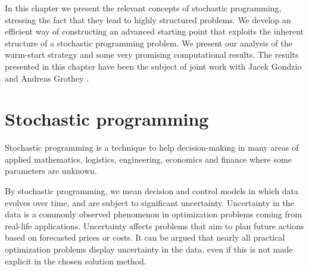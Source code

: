 
%
%
\label{ch:Warmstart}

In this chapter we present the relevant
concepts of stochastic programming, stressing the fact that
they lead to highly structured problems.
We develop an efficient way of constructing an advanced starting
point that exploits the inherent structure of a stochastic programming
problem. We present our analysis of the warm-start strategy and
some very promising computational results.
The results presented in this chapter have been the subject
of joint work with Jacek Gondzio and Andreas Grothey
\cite{ColomboGondzioGrothey06}. 


%
%
\section{Stochastic programming}

Stochastic programming \cite{BirgeLouveaux,KallWallace}
is a technique to help decision-making 
in many areas of applied mathematics, logistics, engineering, economics and 
finance where some parameters are unknown.


By stochastic programming, we mean decision and control models in which 
data evolves over time, and are subject to significant uncertainty.
%
Uncertainty in the data is a commonly observed phenomenon in
optimization problems coming from real-life applications. Uncertainty
affects problems that aim to plan future actions based on forecasted
prices or costs. It can be argued that nearly all practical
optimization problems display uncertainty in the data, even if this is
not made explicit in the chosen solution method. 


